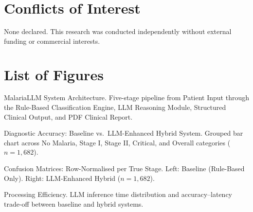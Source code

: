 \documentclass[12pt,a4paper]{article}
\begin{document}
\section*{Conflicts of Interest}

None declared. This research was conducted independently without external funding or commercial interests.


\section*{List of Figures}

\begin{description}[leftmargin=5em, style=nextline]
  \item[Figure~\ref{fig:architecture}] MalariaLLM System Architecture. Five-stage pipeline from Patient Input through the Rule-Based Classification Engine, LLM Reasoning Module, Structured Clinical Output, and PDF Clinical Report.
  \item[Figure~\ref{fig:accuracy}] Diagnostic Accuracy: Baseline vs.\ LLM-Enhanced Hybrid System. Grouped bar chart across No Malaria, Stage I, Stage II, Critical, and Overall categories ($n = 1{,}682$).
  \item[Figure~\ref{fig:confusion}] Confusion Matrices: Row-Normalised per True Stage. Left: Baseline (Rule-Based Only). Right: LLM-Enhanced Hybrid ($n = 1{,}682$).
  \item[Figure~\ref{fig:timing}] Processing Efficiency. LLM inference time distribution and accuracy--latency trade-off between baseline and hybrid systems.
\end{description}
\end{document}
